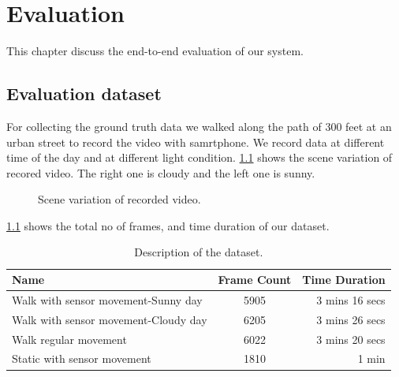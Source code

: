 \chapter{Evaluation}
\label{c:evalu}

This chapter discuss the end-to-end evaluation of our system.

\section{Evaluation dataset}
\label{s:eval}
For collecting the ground truth data we walked along the path of 300 feet at an urban street to record the video with samrtphone.
We record data at different time of the day and at different light condition.
\ref{f:dataset} shows the scene variation of recored video.
The right one is cloudy and the left one is sunny.

\begin{figure}[!ht]
\centering
{}
\hfill
{}
\caption{Scene variation of recorded video.}
\label{f:dataset}
\end{figure}

\ref{t:dataset} shows the total no of frames, and time duration of our dataset.

\begin{table}[h!]
  \centering
  \caption{Description of the dataset.}
  \label{t:dataset}
  \begin{tabular}{  l  c  r  }
   
    Name & Frame Count & Time Duration \\
    \hline
    Walk with sensor movement-Sunny day & 5905 & 3 mins 16 secs  \\
    Walk with sensor movement-Cloudy day & 6205 & 3 mins 26 secs \\
    Walk regular movement & 6022 & 3 mins 20 secs \\
    Static with sensor movement & 1810 & 1 min \\
    \hline
  \end{tabular}
\end{table}

